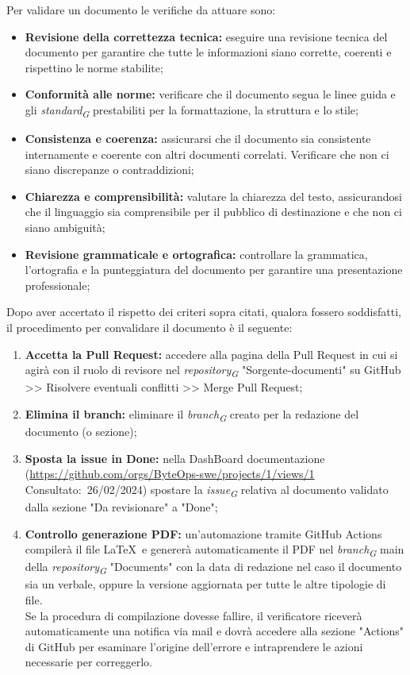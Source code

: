 Per validare un documento le verifiche da attuare sono:
\begin{itemize}
    \item \textbf{Revisione della correttezza tecnica:} 
        eseguire una revisione tecnica del documento per garantire che tutte le informazioni siano corrette, coerenti e rispettino le norme stabilite; 
    \item \textbf{Conformità alle norme:} 
        verificare che il documento segua le linee guida e gli \textit{standard}\textsubscript{\textit{G}} prestabiliti per la formattazione, la struttura e lo stile; 
    \item \textbf{Consistenza e coerenza:} 
        assicurarsi che il documento sia consistente internamente e coerente con altri documenti correlati. Verificare che non ci siano discrepanze o contraddizioni;
    \item \textbf{Chiarezza e comprensibilità:} 
        valutare la chiarezza del testo, assicurandosi che il linguaggio sia comprensibile per il pubblico di destinazione e che non ci siano ambiguità;
    \item \textbf{Revisione grammaticale e ortografica:} 
        controllare la grammatica, l'ortografia e la punteggiatura del documento per garantire una presentazione professionale;
\end{itemize}

Dopo aver accertato il rispetto dei criteri sopra citati, qualora fossero soddisfatti, il procedimento per convalidare il documento è il seguente:

\begin{enumerate}
    \item \textbf{Accetta la Pull Request:} 
        accedere alla pagina della Pull Request in cui si agirà con il ruolo di revisore nel \textit{repository}\textsubscript{\textit{G}} "Sorgente-documenti" su GitHub >> Risolvere eventuali conflitti >> Merge Pull Request;
    \item \textbf{Elimina il branch:} 
        eliminare il \textit{branch}\textsubscript{\textit{G}} creato per la redazione del documento (o sezione);
    \item \textbf{Sposta la issue in Done:} 
        nella DashBoard documentazione (\url{https://github.com/orgs/ByteOps-swe/projects/1/views/1} Consultato:~26/02/2024) spostare la \textit{issue}\textsubscript{\textit{G}} relativa al documento validato dalla sezione "Da revisionare" a "Done";
    \item \textbf{Controllo generazione PDF:} 
        un'automazione tramite GitHub Actions compilerà il file \LaTeX\ e genererà automaticamente il PDF nel \textit{branch}\textsubscript{\textit{G}} main della \textit{repository}\textsubscript{\textit{G}} "Documents" con la data di redazione nel caso il documento sia un verbale, oppure la versione aggiornata per tutte le altre tipologie di file. \\
        Se la procedura di compilazione dovesse fallire, il verificatore riceverà automaticamente una notifica via mail e dovrà accedere alla sezione "Actions" di GitHub per esaminare l'origine dell'errore e intraprendere le azioni necessarie per correggerlo.
\end{enumerate}


